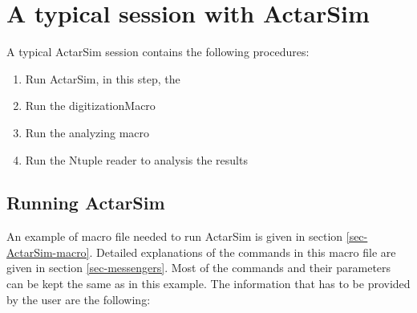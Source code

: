 \section{A typical session with ActarSim}
A typical ActarSim session contains the following procedures:
\begin{enumerate}
 \item Run ActarSim, in this step, the
 \item Run the digitizationMacro
 \item Run the analyzing macro
 \item Run the Ntuple reader to analysis the results
\end{enumerate}

\subsection{Running ActarSim}
An example of macro file needed to run ActarSim is given in section \ref{sec-ActarSim-macro}. Detailed explanations of the commands in this macro file are given in section \ref{sec-messengers}. Most of the commands and their parameters can be kept the same as in this example. The information that has to be provided by the user are the following:

